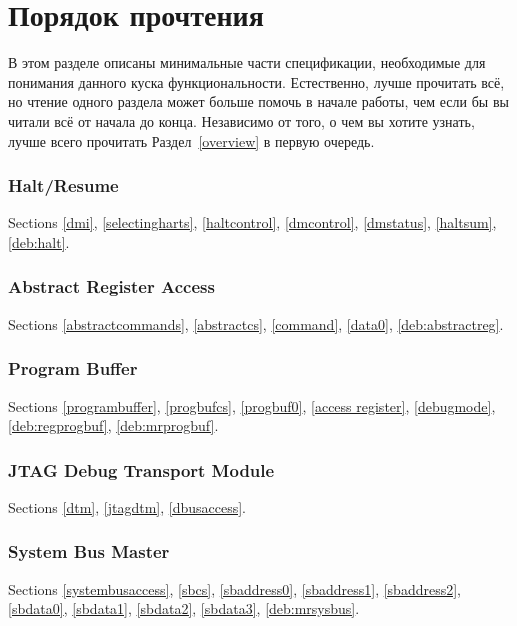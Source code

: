 \section{Порядок прочтения}

В этом разделе описаны минимальные части спецификации, необходимые для понимания
данного куска функциональности. Естественно, лучше прочитать всё, но чтение одного раздела 
может больше помочь в начале работы, чем если бы вы читали всё от начала до конца.
Независимо от того, о чем вы хотите узнать, лучше всего прочитать Раздел~\ref{overview}
в первую очередь.

\subsubsection{Halt/Resume}

Sections \ref{dmi}, \ref{selectingharts}, \ref{haltcontrol}, \ref{dmcontrol}, \ref{dmstatus},
\ref{haltsum}, \ref{deb:halt}.

\subsubsection{Abstract Register Access}

Sections \ref{abstractcommands}, \ref{abstractcs}, \ref{command},
\ref{data0}, \ref{deb:abstractreg}.

\subsubsection{Program Buffer}

Sections \ref{programbuffer}, \ref{progbufcs}, \ref{progbuf0}, \ref{access
register}, \ref{debugmode}, \ref{deb:regprogbuf}, \ref{deb:mrprogbuf}.

\subsubsection{JTAG Debug Transport Module}

Sections \ref{dtm}, \ref{jtagdtm}, \ref{dbusaccess}.

\subsubsection{System Bus Master}

Sections \ref{systembusaccess}, \ref{sbcs}, \ref{sbaddress0}, \ref{sbaddress1},
\ref{sbaddress2}, \ref{sbdata0}, \ref{sbdata1}, \ref{sbdata2}, \ref{sbdata3},
\ref{deb:mrsysbus}.

